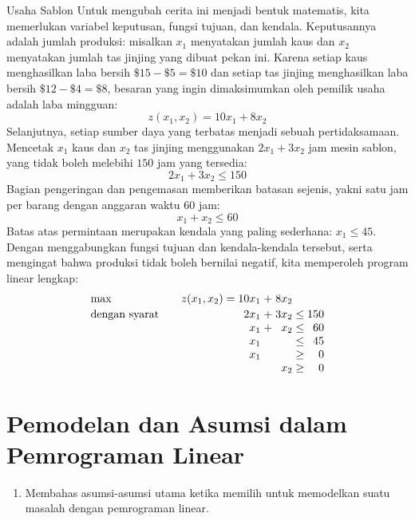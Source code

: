 \begin{example}{Usaha Sablon}{}
Untuk mengubah cerita ini menjadi bentuk matematis, kita memerlukan variabel keputusan, fungsi tujuan, dan kendala. Keputusannya adalah jumlah produksi: misalkan $x_1$ menyatakan jumlah kaus dan $x_2$ menyatakan jumlah tas jinjing yang dibuat pekan ini. Karena setiap kaus menghasilkan laba bersih $\$15 - \$5 = \$10$ dan setiap tas jinjing menghasilkan laba bersih $\$12 - \$4 = \$8$, besaran yang ingin dimaksimumkan oleh pemilik usaha adalah laba mingguan:
\begin{equation}
z(x_1,x_2) = 10x_1 + 8x_2
\end{equation}
Selanjutnya, setiap sumber daya yang terbatas menjadi sebuah pertidaksamaan. Mencetak $x_1$ kaus dan $x_2$ tas jinjing menggunakan $2x_1 + 3x_2$ jam mesin sablon, yang tidak boleh melebihi $150$ jam yang tersedia:
\begin{equation}
2x_1 + 3x_2 \leq 150
\end{equation}
Bagian pengeringan dan pengemasan memberikan batasan sejenis, yakni satu jam per barang dengan anggaran waktu $60$ jam:
\begin{equation}
x_1 + x_2 \leq 60
\end{equation}
Batas atas permintaan merupakan kendala yang paling sederhana: $x_1 \leq 45$. Dengan menggabungkan fungsi tujuan dan kendala-kendala tersebut, serta mengingat bahwa produksi tidak boleh bernilai negatif, kita memperoleh program linear lengkap:
\begin{equation}
\begin{array}{l r@{\;}c@{\;}r@{\;}c@{\;}r}
\max & z(x_1,x_2) = 10x_1 & + & 8x_2 & & \\[2pt]
\st  & 2x_1 & + & 3x_2 & \leq & 150 \\
     & x_1  & + & x_2  & \leq & 60  \\
     & x_1  &   &      & \leq & 45  \\
     & x_1  &   &      & \geq & 0   \\
     &      &   & x_2  & \geq & 0
\end{array}
\label{eqn:ScreenPrintEx}
\end{equation}
\label{ex:ScreenPrint}
\end{example}

\section{Pemodelan dan Asumsi dalam Pemrograman Linear}
\label{sec:lp-modeling-assumptions}

\begin{outcome}
\begin{enumerate}
\item Membahas asumsi-asumsi utama ketika memilih untuk memodelkan suatu masalah dengan pemrograman linear.
\end{enumerate}
\end{outcome}

